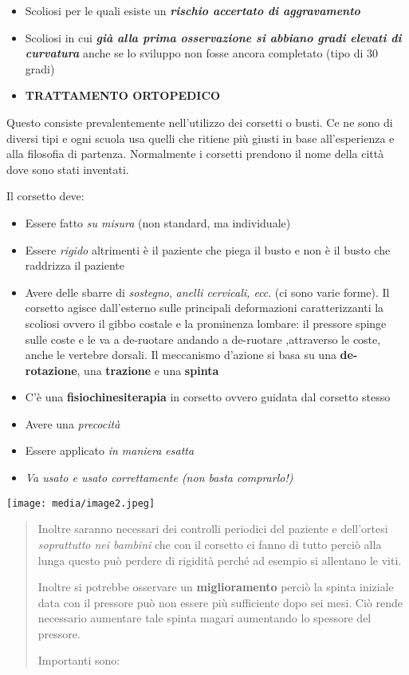 \documentclass[]{article}
\begin{document}
\begin{itemize}
\item
  Scoliosi per le quali esiste un \textbf{\emph{rischio accertato di
  aggravamento}}
\item
  Scoliosi in cui \textbf{\emph{già alla prima osservazione si abbiano
  gradi elevati di curvatura}} anche se lo sviluppo non fosse ancora
  completato (tipo di 30 gradi)
\end{itemize}

\begin{itemize}
\item
  \textbf{TRATTAMENTO ORTOPEDICO}
\end{itemize}

Questo consiste prevalentemente nell'utilizzo dei corsetti o busti. Ce
ne sono di diversi tipi e ogni scuola usa quelli che ritiene più giusti
in base all'esperienza e alla filosofia di partenza. Normalmente i
corsetti prendono il nome della città dove sono stati inventati.

Il corsetto deve:

\begin{itemize}
\item
  Essere fatto \emph{su misura} (non standard, ma individuale)
\item
  Essere \emph{rigido} altrimenti è il paziente che piega il busto e non
  è il busto che raddrizza il paziente
\item
  Avere delle sbarre di \emph{sostegno}, \emph{anelli cervicali, ecc}.
  (ci sono varie forme). Il corsetto agisce dall'esterno sulle
  principali deformazioni caratterizzanti la scoliosi ovvero il gibbo
  costale e la prominenza lombare: il pressore spinge sulle coste e le
  va a de-ruotare andando a de-ruotare ,attraverso le coste, anche le
  vertebre dorsali. Il meccanismo d'azione si basa su una
  \textbf{de-rotazione}, una \textbf{trazione} e una \textbf{spinta}
\item
  C'è una \textbf{fisiochinesiterapia} in corsetto ovvero guidata dal
  corsetto stesso
\item
  Avere una \emph{precocità}
\item
  Essere applicato \emph{in maniera esatta}
\item
  \emph{\emph{Va usato e usato correttamente (non basta comprarlo!)}}
\end{itemize}

\texttt{[image: media/image2.jpeg]}

\begin{quote}
Inoltre saranno necessari dei controlli periodici del paziente e
dell'ortesi \emph{soprattutto nei bambini} che con il corsetto ci fanno
di tutto perciò alla lunga questo può perdere di rigidità perché ad
esempio si allentano le viti.

Inoltre si potrebbe osservare un \textbf{miglioramento} perciò la spinta
iniziale data con il pressore può non essere più sufficiente dopo sei
mesi. Ciò rende necessario aumentare tale spinta magari aumentando lo
spessore del pressore.

Importanti sono:
\end{quote}
\end{document}
